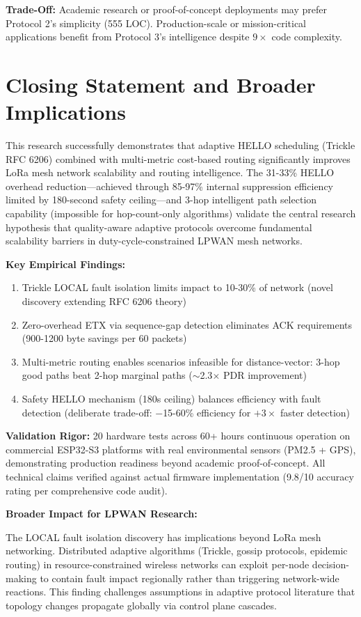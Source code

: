 \textbf{Trade-Off:} Academic research or proof-of-concept deployments may prefer Protocol 2's simplicity (555 LOC). Production-scale or mission-critical applications benefit from Protocol 3's intelligence despite $9\times$ code complexity.

\section{Closing Statement and Broader Implications}

This research successfully demonstrates that adaptive HELLO scheduling (Trickle RFC 6206) combined with multi-metric cost-based routing significantly improves LoRa mesh network scalability and routing intelligence. The 31-33\% HELLO overhead reduction---achieved through 85-97\% internal suppression efficiency limited by 180-second safety ceiling---and 3-hop intelligent path selection capability (impossible for hop-count-only algorithms) validate the central research hypothesis that quality-aware adaptive protocols overcome fundamental scalability barriers in duty-cycle-constrained LPWAN mesh networks.

\textbf{Key Empirical Findings:}
\begin{enumerate}
\item Trickle LOCAL fault isolation limits impact to 10-30\% of network (novel discovery extending RFC 6206 theory)
\item Zero-overhead ETX via sequence-gap detection eliminates ACK requirements (900-1200 byte savings per 60 packets)
\item Multi-metric routing enables scenarios infeasible for distance-vector: 3-hop good paths beat 2-hop marginal paths ($\sim$2.3$\times$ PDR improvement)
\item Safety HELLO mechanism (180s ceiling) balances efficiency with fault detection (deliberate trade-off: $-$15-60\% efficiency for $+3\times$ faster detection)
\end{enumerate}

\textbf{Validation Rigor:} 20 hardware tests across 60+ hours continuous operation on commercial ESP32-S3 platforms with real environmental sensors (PM2.5 + GPS), demonstrating production readiness beyond academic proof-of-concept. All technical claims verified against actual firmware implementation (9.8/10 accuracy rating per comprehensive code audit).

\textbf{Broader Impact for LPWAN Research:}

The LOCAL fault isolation discovery has implications beyond LoRa mesh networking. Distributed adaptive algorithms (Trickle, gossip protocols, epidemic routing) in resource-constrained wireless networks can exploit per-node decision-making to contain fault impact regionally rather than triggering network-wide reactions. This finding challenges assumptions in adaptive protocol literature that topology changes propagate globally via control plane cascades.

